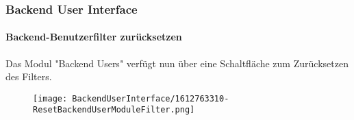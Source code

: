 %

\begin{frame}[fragile]
	\frametitle{Backend User Interface}
	\framesubtitle{Backend-Benutzerfilter zurücksetzen}

	Das Modul "Backend Users" verfügt nun über eine Schaltfläche zum Zurücksetzen des Filters.

	\begin{figure}
		\texttt{[image: BackendUserInterface/1612763310-ResetBackendUserModuleFilter.png]}
	\end{figure}

\end{frame}

